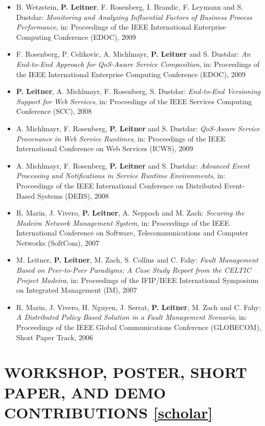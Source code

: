 \documentclass[paper=letter,fontsize=11pt]{scrartcl} %
\newcommand{\NewPart}[2]{\section*{\uppercase{#1} #2}}
\begin{document}
\begin{itemize}
\item B. Wetzstein, \textbf{P. Leitner}, F. Rosenberg, I. Brandic, F. Leymann and S. Dustdar: \emph{Monitoring and Analyzing Influential Factors of Business Process Performance}, in: Proceedings of the IEEE International Enterprise Computing Conference (EDOC), 2009
\item F. Rosenberg, P. Celikovic, A. Michlmayr, \textbf{P. Leitner} and S. Dustdar: \emph{An End-to-End Approach for QoS-Aware Service Composition}, in: Proceedings of the IEEE International Enterprise Computing Conference (EDOC), 2009
\item \textbf{P. Leitner}, A. Michlmayr, F. Rosenberg, S. Dustdar: \emph{End-to-End Versioning Support for Web Services}, in: Proceedings of the IEEE Services Computing Conference (SCC), 2008
\item A. Michlmayr, F. Rosenberg, \textbf{P. Leitner} and S. Dustdar: \emph{QoS-Aware Service Provenance in Web Service Runtimes}, in: Proceedings of the IEEE International Conference on Web Services (ICWS), 2009
\item A. Michlmayr, F. Rosenberg, \textbf{P. Leitner} and S. Dustdar: \emph{Advanced Event Processing and Notifications in Service Runtime Environments}, in: Proceedings of the IEEE International Conference on Distributed Event-Based Systems (DEBS), 2008
\item R. Marin, J. Vivero, \textbf{P. Leitner}, A. Neppach and M. Zach: \emph{Securing the Madeira Network Management System}, in: Proceedings of the IEEE International Conference on Software, Telecommunications and Computer Networks (SoftCom), 2007
\item M. Leitner, \textbf{P. Leitner}, M. Zach, S. Collins and C. Fahy: \emph{Fault
Management Based on Peer-to-Peer Paradigms; A Case Study Report from the CELTIC
Project Madeira}, in: Proceedings of the IFIP/IEEE International Symposium on Integrated
Management (IM), 2007
\item R. Marin, J. Vivero, H. Nguyen, J. Serrat, \textbf{P. Leitner}, M. Zach and C. Fahy: \emph{A Distributed Policy Based Solution in a Fault Management Scenario}, in: Proceedings of the IEEE Global Communications Conference (GLOBECOM), Short Paper Track, 2006
\end{itemize}

\NewPart{Workshop, Poster, Short Paper, and Demo Contributions}{\href{https://scholar.google.ch/citations?user=wZ9f8CAAAAAJ}{[scholar]}}
\end{document}
